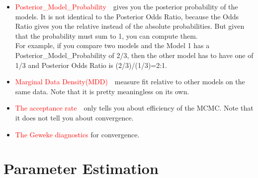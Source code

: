 \documentclass[10pt,math=newtx,citestyle=gb7714-2015,bibstyle=gb7714-2015]{elegantbook}
\begin{document}
{{{\begin{enumerate}
\begin{itemize}
{				\begin{itemize}
					\item to treat comparison as a decision problem, computing the expected value or cost of each model choice;
					\item to use minimum message length(MML).
				\end{itemize}
			}.
			\item \textcolor{red}{Posterior\_Model\_Probability}~~gives you the posterior probability of the models. It is not identical to the Posterior Odds Ratio, because the Odds Ratio gives you the relative instead of the absolute probabilities. But given that the probability must sum to 1, you can compute them.\\
			For example, if you compare two models and the Model 1 has a Posterior\_Model\_Probability of 2/3, then the other model has to have one of 1/3 and Posterior Odds Ratio is (2/3)/(1/3)=2:1.
			\item \textcolor{red}{Marginal Data Density(MDD)}~~measure fit relative to other models on the same data. Note that it is pretty meaningless on its own.
			\item \textcolor{red}{The acceptance rate}~~only tells you about efficiency of the MCMC. Note that it does not tell you about convergence.
			\item \textcolor{red}{The Geweke diagnostics} for convergence.
		\end{itemize}
		
	\end{enumerate}
	
	\section{Parameter Estimation}
	
}}}
\end{document}
